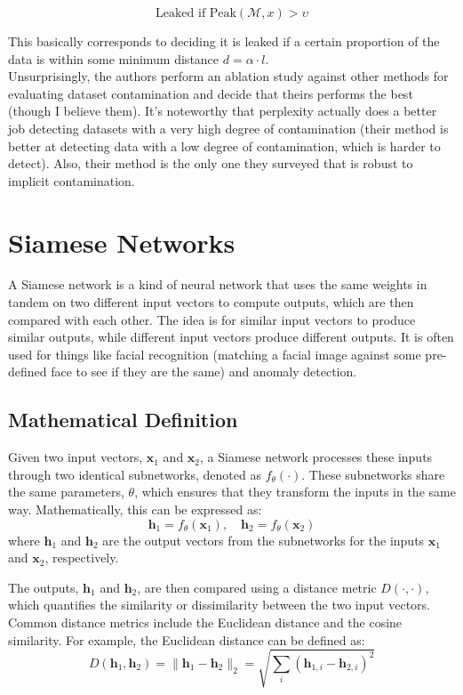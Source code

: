 \documentclass[12pt]{article}
\begin{document}
\[\text{Leaked if Peak}(\mathcal{M}, x)>\upsilon \]

This basically corresponds to deciding it is leaked if a certain proportion of the data is within some minimum distance \(d = \alpha \cdot l\).\\

Unsurprisingly, the authors perform an ablation study against other methods for evaluating dataset contamination and decide that theirs performs the best (though I believe them). It's noteworthy that perplexity actually does a better job detecting datasets with a very high degree of contamination (their method is better at detecting data with a low degree of contamination, which is harder to detect). Also, their method is the only one they surveyed that is robust to implicit contamination. 
\section{Siamese Networks}
A Siamese network is a kind of neural network that uses the same weights in tandem on two different input vectors to compute outputs, which are then compared with each other. The idea is for similar input vectors to produce similar outputs, while different input vectors produce different outputs. It is often used for things like facial recognition (matching a facial image against some pre-defined face to see if they are the same) and anomaly detection. 

\subsection{Mathematical Definition}
Given two input vectors, \(\mathbf{x}_1\) and \(\mathbf{x}_2\), a Siamese network processes these inputs through two identical subnetworks, denoted as \(f_{\theta}(\cdot)\). These subnetworks share the same parameters, \(\theta\), which ensures that they transform the inputs in the same way. Mathematically, this can be expressed as:
\[
\mathbf{h}_1 = f_{\theta}(\mathbf{x}_1), \quad \mathbf{h}_2 = f_{\theta}(\mathbf{x}_2)
\]
where \(\mathbf{h}_1\) and \(\mathbf{h}_2\) are the output vectors from the subnetworks for the inputs \(\mathbf{x}_1\) and \(\mathbf{x}_2\), respectively.

The outputs, \(\mathbf{h}_1\) and \(\mathbf{h}_2\), are then compared using a distance metric \(D(\cdot, \cdot)\), which quantifies the similarity or dissimilarity between the two input vectors. Common distance metrics include the Euclidean distance and the cosine similarity. For example, the Euclidean distance can be defined as:
\[
D(\mathbf{h}_1, \mathbf{h}_2) = \|\mathbf{h}_1 - \mathbf{h}_2\|_2 = \sqrt{\sum_{i} (\mathbf{h}_{1,i} - \mathbf{h}_{2,i})^2}
\]
\end{document}
